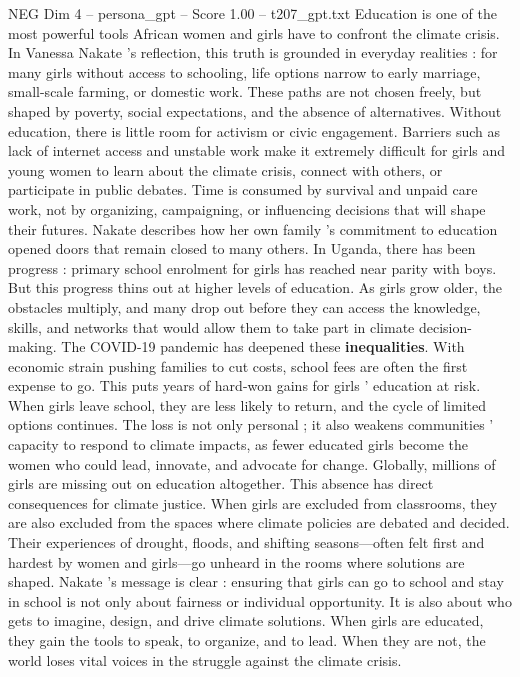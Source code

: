 \begin{textsample}{NEG Dim 4 – persona\_gpt – Score 1.00 – t207\_gpt.txt}  \label{ex:f4_neg_036}
Education is one of the most powerful tools African women and girls have to confront the climate crisis.
In Vanessa Nakate ’s reflection, this truth is grounded in everyday realities : for many girls without access to schooling, life options narrow to early marriage, small-scale farming, or domestic work.
These paths are not chosen freely, but shaped by poverty, social expectations, and the absence of alternatives.
Without education, there is little room for activism or civic engagement.
Barriers such as lack of internet access and unstable work make it extremely difficult for girls and young women to learn about the climate crisis, connect with others, or participate in public debates.
Time is consumed by survival and unpaid care work, not by organizing, campaigning, or influencing decisions that will shape their futures.
Nakate describes how her own family ’s commitment to education opened doors that remain closed to many others.
In Uganda, there has been progress : primary school enrolment for girls has reached near parity with boys.
But this progress thins out at higher levels of education.
As girls grow older, the obstacles multiply, and many drop out before they can access the knowledge, skills, and networks that would allow them to take part in climate decision-making.
The COVID-19 pandemic has deepened these \textbf{inequalities}.
With economic strain pushing families to cut costs, school fees are often the first expense to go.
This puts years of hard-won gains for girls ’ education at risk.
When girls leave school, they are less likely to return, and the cycle of limited options continues.
The loss is not only personal ; it also weakens communities ’ capacity to respond to climate impacts, as fewer educated girls become the women who could lead, innovate, and advocate for change.
Globally, millions of girls are missing out on education altogether.
This absence has direct consequences for climate justice.
When girls are excluded from classrooms, they are also excluded from the spaces where climate policies are debated and decided.
Their experiences of drought, floods, and shifting seasons—often felt first and hardest by women and girls—go unheard in the rooms where solutions are shaped.
Nakate ’s message is clear : ensuring that girls can go to school and stay in school is not only about fairness or individual opportunity.
It is also about who gets to imagine, design, and drive climate solutions.
When girls are educated, they gain the tools to speak, to organize, and to lead.
When they are not, the world loses vital voices in the struggle against the climate crisis.

\end{textsample}
